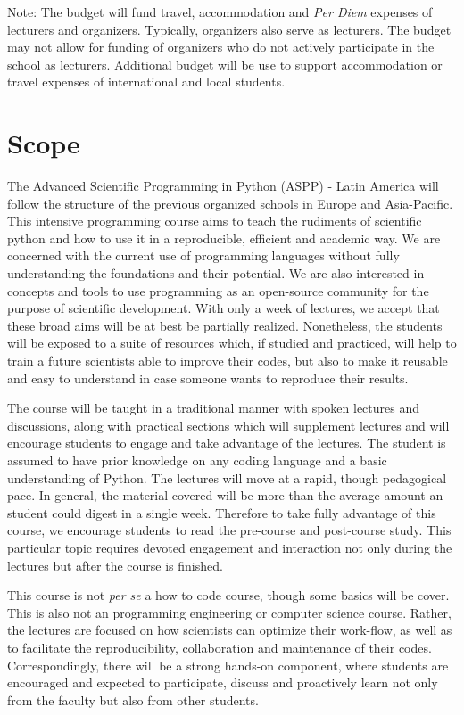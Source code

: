 \documentclass{article}
\begin{document}
Note: The budget will fund travel, accommodation and \textit{Per Diem} expenses of lecturers and organizers. Typically, organizers also serve as lecturers. The budget may not allow for funding of organizers who do not actively participate in the school as lecturers. Additional budget will be use to support accommodation or travel expenses of international and local students.

\section*{Scope}

The Advanced Scientific Programming in Python (ASPP) - Latin America will follow the structure of the previous organized schools in Europe and Asia-Pacific. This intensive programming course aims to teach the rudiments of scientific python and how to use it in a reproducible, efficient and academic way. We are concerned with the current use of programming languages without fully understanding the foundations and their potential. We are also interested in concepts and tools to use programming as an open-source community for the purpose of scientific development. With only a week of lectures, we accept that these broad aims will be at best be partially realized. Nonetheless, the students will be exposed to a suite of resources which, if studied and practiced, will help to train a future scientists able to improve their codes, but also to make it reusable and easy to understand in case someone wants to reproduce their results.

The course will be taught in a traditional manner with spoken lectures and discussions, along with practical sections which will supplement lectures and will encourage students to engage and take advantage of the lectures. The student is assumed to have prior knowledge on any coding language and a basic understanding of Python. The lectures will move at a rapid, though pedagogical pace. In general, the material covered will be more than the average amount an student could digest in a single week. Therefore to take fully advantage of this course, we encourage students to read the pre-course and post-course study. This particular topic requires devoted engagement and interaction not only during the lectures but after the course is finished. 

This course is not \textit{per se} a how to code course, though some basics will be cover. This is also not an programming engineering or computer science course. Rather, the lectures are focused on how scientists can optimize their work-flow, as well as to facilitate the reproducibility, collaboration and maintenance of their codes. Correspondingly, there will be a strong hands-on component, where students are encouraged and expected to participate, discuss and proactively learn not only from the faculty but also from other students. 
\end{document}
